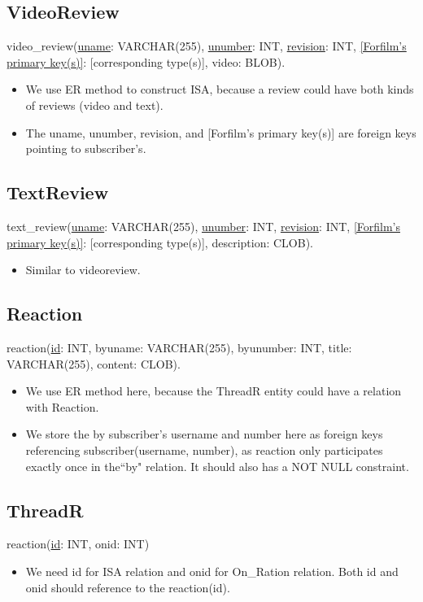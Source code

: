 \documentclass[11pt,fleqn]{exam}
\begin{document}
\subsection*{VideoReview}
video\_review(\underline{uname}: VARCHAR(255), \underline{unumber}: INT,  \underline{revision}: INT, \underline{[Forfilm's primary key(s)]}: [corresponding type(s)], video: BLOB).
\begin{itemize}
\item We use ER method to construct ISA, because a review could have both kinds of reviews (video and text).
\item The uname, unumber, revision, and [Forfilm's primary key(s)] are foreign keys pointing to subscriber's.
\end{itemize}

\subsection*{TextReview}
text\_review(\underline{uname}: VARCHAR(255), \underline{unumber}: INT,  \underline{revision}: INT, \underline{[Forfilm's primary key(s)]}: [corresponding type(s)], description: CLOB).
\begin{itemize}
\item Similar to videoreview.
\end{itemize}

\subsection*{Reaction}
reaction(\underline{id}: INT, byuname: VARCHAR(255),  byunumber: INT, title: VARCHAR(255), content: CLOB).
\begin{itemize}
\item We use ER method here, because the ThreadR entity could have a relation with Reaction.
\item We store the by subscriber's username and number here as foreign keys referencing subscriber(username, number), as reaction only participates exactly once in the``by" relation. It should also has a NOT NULL constraint.
\end{itemize}

\subsection*{ThreadR}
reaction(\underline{id}: INT, onid: INT)
\begin{itemize}
\item We need id for ISA relation and onid for On\_Ration relation. Both id and onid should reference to the reaction(id).
\end{itemize}
\end{document}
